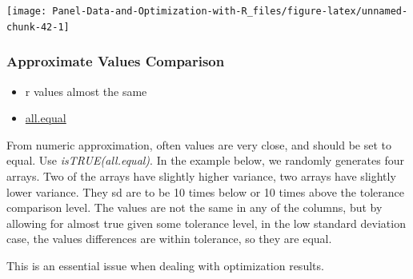 \documentclass[
]{book}
\providecommand{\tightlist}{%
  \setlength{\itemsep}{0pt}\setlength{\parskip}{0pt}}
\begin{document}
\begin{center}\texttt{[image: Panel-Data-and-Optimization-with-R\_files/figure-latex/unnamed-chunk-42-1]} \end{center}

\hypertarget{approximate-values-comparison}{%
\subsubsection{Approximate Values Comparison}\label{approximate-values-comparison}}

\begin{itemize}
\tightlist
\item
  r values almost the same
\item
  \href{https://stat.ethz.ch/R-manual/R-patched/library/base/html/all.equal.html}{all.equal}
\end{itemize}

From numeric approximation, often values are very close, and should be set to equal. Use \emph{isTRUE(all.equal)}. In the example below, we randomly generates four arrays. Two of the arrays have slightly higher variance, two arrays have slightly lower variance. They sd are to be 10 times below or 10 times above the tolerance comparison level. The values are not the same in any of the columns, but by allowing for almost true given some tolerance level, in the low standard deviation case, the values differences are within tolerance, so they are equal.

This is an essential issue when dealing with optimization results.
\end{document}

